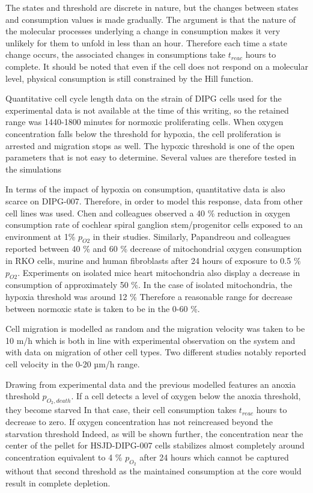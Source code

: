 \documentclass[11pt,a4paper]{article}
\begin{document}
The states and threshold are discrete in nature, but the changes between states and consumption values is made gradually. The argument is that the nature of the molecular processes underlying a change in consumption makes it very unlikely for them to unfold in less than an hour. Therefore each time a state change occurs, the associated changes in consumptions take $t_{reac}$ hours to complete. It should be noted that even if the cell does not respond on a molecular level, physical consumption is still constrained by the Hill function.

Quantitative cell cycle length data on the strain of DIPG cells used for the experimental data is not available at the time of this writing, so the retained range was 1440-1800 minutes for normoxic proliferating cells. When oxygen concentration falls below the threshold for hypoxia, the cell proliferation is arrested and migration stops as well. The hypoxic threshold is one of the open parameters that is not easy to determine. Several values are therefore tested in the simulations

In terms of the impact of hypoxia on consumption, quantitative data is also scarce on DIPG-007. Therefore, in order to model this response, data from other cell lines was used. Chen and colleagues observed a 40 \% reduction in oxygen consumption rate of cochlear spiral ganglion stem/progenitor cells exposed to an environment at 1\% $p_{O2}$ in their studies.\cite{Chen2015} Similarly, Papandreou and colleagues reported between 40 \% and 60 \% decrease of mitochondrial oxygen consumption in RKO cells, murine and human fibroblasts after 24 hours of exposure to 0.5 \% $p_{O2}$.\cite{Papandreou2006} Experiments on isolated mice heart mitochondria also display a decrease in consumption of approximately 50 \%.\cite{Zhu2020} In the case of isolated mitochondria, the hypoxia threshold was around 12 \% Therefore a reasonable range for decrease between normoxic state is taken to be in the 0-60 \%.

Cell migration is modelled as random and the migration velocity was taken to be 10 \textmu m/h which is both in line with experimental observation on the system and with data on migration of other cell types.\cite{Friedl2003} Two different studies notably reported cell velocity in the 0-20 µm/h range.\cite{Demuth2000}\cite{Sengul2021}

Drawing from experimental data and the previous modelled features an anoxia threshold $p_{O_2,death}$. If a cell detects a level of oxygen below the anoxia threshold, they become starved In that case, their cell consumption takes $t_{reac}$ hours to decrease to zero. If oxygen concentration has not reincreased beyond the starvation threshold Indeed, as will be shown further, the concentration near the center of the pellet for HSJD-DIPG-007 cells stabilizes almost completely around  concentration equivalent to 4 \% $p_{O_2}$ after 24 hours which cannot be captured without that second threshold as the maintained consumption at the core would result in complete depletion.  
\end{document}
